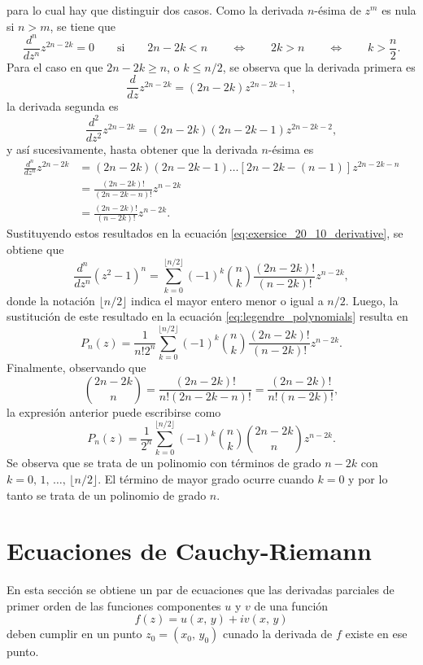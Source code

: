 \documentclass[a4paper]{report}
\begin{document}
para lo cual hay que distinguir dos casos. Como la derivada \(n\)-ésima de \(z^m\) es nula si \(n>m\), se tiene que 
\[
 \frac{d^n}{dz^n}z^{2n-2k}=0
 \qquad\textrm{si}\qquad
 2n-2k<n\qquad\Leftrightarrow\qquad 2k>n \qquad\Leftrightarrow\qquad k>\frac{n}{2}.
\]
Para el caso en que \(2n-2k\geq n\), o \(k\leq n/2\), se observa que la derivada primera es
\[
 \frac{d}{dz}z^{2n-2k}=(2n-2k)z^{2n-2k-1},
\]
la derivada segunda es
\[
 \frac{d^2}{dz^2}z^{2n-2k}=(2n-2k)(2n-2k-1)z^{2n-2k-2},
\]
y así sucesivamente, hasta obtener que la derivada \(n\)-ésima es
\begin{align*}
 \frac{d^n}{dz^n}z^{2n-2k}&=(2n-2k)(2n-2k-1)\dots[2n-2k-(n-1)]z^{2n-2k-n}\\
  &=\frac{(2n-2k)!}{(2n-2k-n)!}z^{n-2k}\\
  &=\frac{(2n-2k)!}{(n-2k)!}z^{n-2k}.
\end{align*}
Sustituyendo estos resultados en la ecuación \ref{eq:exersice_20_10_derivative}, se obtiene que 
\[
 \frac{d^n}{dz^n}(z^2-1)^n=\sum_{k=0}^{\lfloor n/2\rfloor}(-1)^k\binom{n}{k}\frac{(2n-2k)!}{(n-2k)!}z^{n-2k},
\]
donde la notación \(\lfloor n/2\rfloor\) indica el mayor entero menor o igual a \(n/2\). Luego, la sustitución de este resultado en la ecuación \ref{eq:legendre_polynomials} resulta en 
\[
 P_n(z)=\frac{1}{n!2^n}\sum_{k=0}^{\lfloor n/2\rfloor}(-1)^k\binom{n}{k}\frac{(2n-2k)!}{(n-2k)!}z^{n-2k}.
\]
Finalmente, observando que 
\[
 \binom{2n-2k}{n}=\frac{(2n-2k)!}{n!(2n-2k-n)!}=\frac{(2n-2k)!}{n!(n-2k)!},
\]
la expresión anterior puede escribirse como
\[
 P_n(z)=\frac{1}{2^n}\sum_{k=0}^{\lfloor n/2\rfloor}(-1)^k\binom{n}{k}\binom{2n-2k}{n}z^{n-2k}.
\]
Se observa que se trata de un polinomio con términos de grado \(n-2k\) con \(k=0,\,1,\,\dots,\,\lfloor n/2\rfloor\). El término de mayor grado ocurre cuando \(k=0\) y por lo tanto se trata de un polinomio de grado \(n\).

\section{Ecuaciones de Cauchy-Riemann}\label{sec:cauchy_riemann_equations}

En esta sección se obtiene un par de ecuaciones que las derivadas parciales de primer orden de las funciones componentes \(u\) y \(v\) de una función 
\[
 f(z)=u(x,\,y)+iv(x,\,y)
\]
deben cumplir en un punto \(z_0=(x_0,\,y_0)\) cunado la derivada de \(f\) existe en ese punto.
\end{document}
